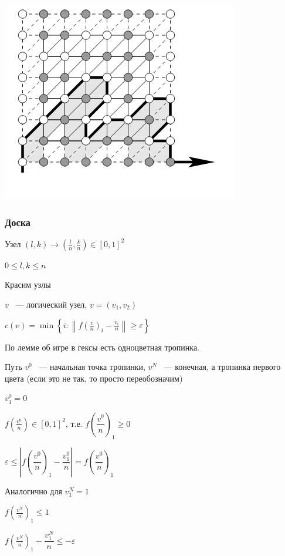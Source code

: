 \documentclass{article}
\begin{document}
			\includegraphics[scale=0.45]{HEXTHEOREM.png}
				
        \subsubsection{Доска}
				
            Узел $(l, k) \rightarrow \left(\frac{l}{n}, \frac{k}{n}\right) \in [0, 1]^2$
				
			$0 \leq l, k \leq n$
				
			Красим узлы
				
			$v$ ~--- логический узел, $v = (v_1, v_2)$
				
			$c(v) = \min \left\{ i : \left\| f\left(\frac{v}{n}\right)_i - \frac{v_i}{n} \right\| \geq \varepsilon \right\}$
			
			По лемме об игре в гексы есть одноцветная тропинка.
				
			Путь $v^0$ ~--- начальная точка тропинки, $v^N$ ~--- конечная, а тропинка первого цвета (если это не так, то просто переобозначим)
				
			$v^0_1 = 0$
				
			$f\left(\frac{v^0}{n}\right) \in [0, 1]^2$, т.е. $f\left(\dfrac{v^0}{n}\right)_1 \geq 0$
				
            $\varepsilon \leq \left| f \left( \dfrac{v^0}{n} \right)_1 - \dfrac{v^0_1}{n} \right| = f \left( \dfrac{v^0}{n} \right)_1$
            
			Аналогично для $v^N_1 = 1$
				
			$f\left(\frac{v^N}{n}\right)_1 \leq 1$
				
			$f\left(\frac{v^N}{n}\right)_1 - \dfrac{v^N_1}{n} \leq -\varepsilon$
				
\end{document}
